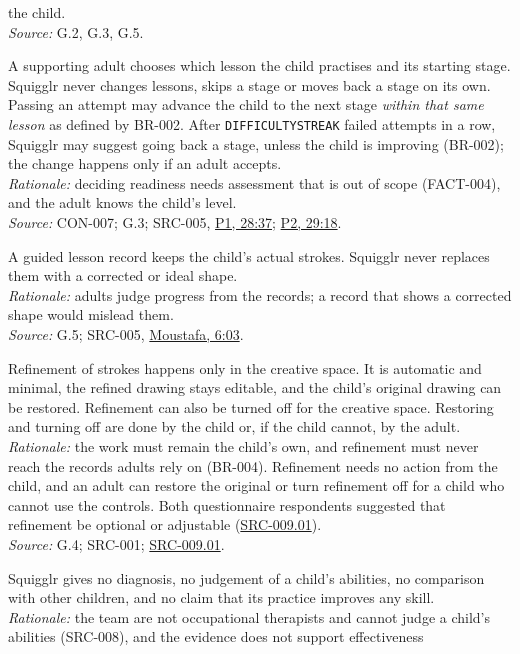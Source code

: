 \documentclass[12pt]{article}
\renewcommand{\_}{\textunderscore\allowbreak}%
\newcommand{\intlink}[3]{\hyperref[int:#1-#2]{#3}}
\newcommand{\intref}[2]{\intlink{#1}{#2}{#1, #2}}
\begin{document}
\begin{description}[style=nextline]
the child.\\
\emph{Source:} G.2, G.3, G.5.
\item[BR-003] A supporting adult chooses which lesson the child practises and
its starting stage. Squigglr never changes lessons, skips a stage or moves back
a stage on its own. Passing an attempt may advance the child to the next stage
\emph{within that same lesson} as defined by BR-002. After
\texttt{DIFFICULTY\_STREAK} failed attempts in a row, Squigglr may suggest going
back a stage, unless the child is improving (BR-002); the change happens only if
an adult accepts.\\
\emph{Rationale:} deciding readiness needs assessment that is out of scope
(FACT-004), and the adult knows the child's level.\\
\emph{Source:} CON-007; G.3; SRC-005, \intref{P1}{28:37}; \intref{P2}{29:18}.
\item[BR-004] A guided lesson record keeps the child's actual strokes. Squigglr
never replaces them with a corrected or ideal shape.\\
\emph{Rationale:} adults judge progress from the records; a record that shows a
corrected shape would mislead them.\\
\emph{Source:} G.5; SRC-005, \intref{Moustafa}{6:03}.
\item[BR-005] Refinement of strokes happens only in the creative space. It is
automatic and minimal, the refined drawing stays editable, and the child's
original drawing can be restored. Refinement can also be turned off for the
creative space. Restoring and turning off are done by the child or, if the child
cannot, by the adult.\\
\emph{Rationale:} the work must remain the child's own, and refinement must
never reach the records adults rely on (BR-004). Refinement needs no action from
the child, and an adult can restore the original or turn refinement off for a
child who cannot use the controls. Both questionnaire respondents suggested that
refinement be optional or adjustable (\hyperref[src:009.01]{SRC-009.01}).\\
\emph{Source:} G.4; SRC-001; \hyperref[src:009.01]{SRC-009.01}.
\item[BR-006] Squigglr gives no diagnosis, no judgement of a child's abilities,
no comparison with other children, and no claim that its practice improves any
skill.\\
\emph{Rationale:} the team are not occupational therapists and cannot judge a
child's abilities (SRC-008), and the evidence does not support effectiveness

\end{description}
\end{document}
